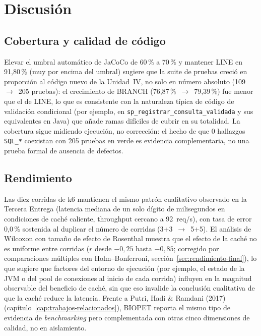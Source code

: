\chapter{Discusi\'on}
\label{cap:discusion}

\section{Cobertura y calidad de c\'odigo}

Elevar el umbral autom\'atico de JaCoCo de 60\,\% a 70\,\% y mantener LINE
en 91{,}80\,\% (muy por encima del umbral) sugiere que la suite de pruebas
creci\'o en proporci\'on al c\'odigo nuevo de la Unidad~IV, no solo en
n\'umero absoluto (109~$\to$~205 pruebas): el crecimiento de BRANCH
(76{,}87\,\%~$\to$~79{,}39\,\%) fue menor que el de LINE, lo que es
consistente con la naturaleza t\'ipica de c\'odigo de validaci\'on
condicional (por ejemplo, en \texttt{sp\_registrar\_consulta\_validada} y
sus equivalentes en Java) que a\~nade ramas dif\'iciles de cubrir en su
totalidad. La cobertura sigue midiendo ejecuci\'on, no correcci\'on: el
hecho de que 0 hallazgos \texttt{SQL\_*} coexistan con 205 pruebas en verde
es evidencia complementaria, no una prueba formal de ausencia de defectos.

\section{Rendimiento}

Las diez corridas de k6 mantienen el mismo patr\'on cualitativo observado
en la Tercera Entrega (latencia mediana de un solo d\'igito de
milisegundos en condiciones de cach\'e caliente, throughput cercano a
92~req/s), con tasa de error 0{,}0\,\% sostenida al duplicar el n\'umero de
corridas (3+3~$\to$~5+5). El an\'alisis de Wilcoxon con tama\~no de efecto
de Rosenthal muestra que el efecto de la cach\'e no es uniforme entre
corridas ($r$ desde $-0{,}25$ hasta $-0{,}85$; corregido por comparaciones
m\'ultiples con Holm--Bonferroni, secci\'on~\ref{sec:rendimiento-final}),
lo que sugiere que factores
del entorno de ejecuci\'on (por ejemplo, el estado de la JVM o del pool de
conexiones al inicio de cada corrida) influyen en la magnitud observable
del beneficio de cach\'e, sin que eso invalide la conclusi\'on cualitativa
de que la cach\'e reduce la latencia. Frente a Putri, Hadi \& Ramdani
(2017)~\cite{putri2017perftesting} (cap\'itulo~\ref{cap:trabajos-relacionados}),
BIOPET reporta el mismo tipo de evidencia de \emph{benchmarking} pero
complementada con otras cinco dimensiones de calidad, no en aislamiento.

